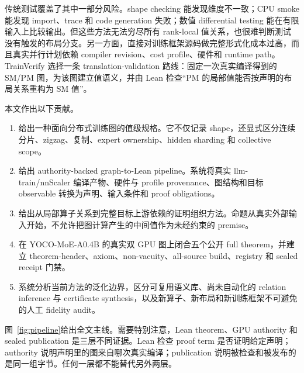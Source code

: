 \documentclass[10.5pt,a4paper]{ctexart}
\begin{document}
传统测试覆盖了其中一部分风险。shape checking 能发现维度不一致；CPU smoke 能发现 import、trace 和 code generation 失败；数值 differential testing 能在有限输入上比较输出。但这些方法无法穷尽所有 rank-local 值关系，也很难判断测试没有触发的布局分支。另一方面，直接对训练框架源码做完整形式化成本过高，而且真实并行计划依赖 compiler revision、cost profile、硬件和 runtime path。TrainVerify 选择一条 translation-validation 路线：固定一次真实编译得到的 SM/PM 图，为该图建立值语义，并由 Lean 检查“PM 的局部值能否按声明的布局关系重构为 SM 值”。

本文作出以下贡献。
\begin{enumerate}
  \item 给出一种面向分布式训练图的值级规格。它不仅记录 shape，还显式区分连续分片、zigzag、复制、expert ownership、hidden sharding 和 collective scope。
  \item 给出 authority-backed graph-to-Lean pipeline。系统将真实 llm-train/nnScaler 编译产物、硬件与 profile provenance、图结构和目标 observable 转换为声明、输入条件和 proof obligations。
  \item 给出从局部算子关系到完整目标上游依赖的证明组织方法。命题从真实外部输入开始，不允许把图计算产生的中间值作为未经约束的 premise。
  \item 在 YOCO-MoE-A0.4B 的真实双 GPU 图上闭合五个公开 full theorem，并建立 theorem-header、axiom、non-vacuity、all-source build、registry 和 sealed receipt 门禁。
  \item 系统分析当前方法的泛化边界，区分可复用语义库、尚未自动化的 relation inference 与 certificate synthesis，以及新算子、新布局和新训练框架不可避免的人工 fidelity audit。
\end{enumerate}

图~\ref{fig:pipeline}给出全文主线。需要特别注意，Lean theorem、GPU authority 和 sealed publication 是三层不同证据。Lean 检查 proof term 是否证明给定声明；authority 说明声明里的图来自哪次真实编译；publication 说明被检查和被发布的是同一组字节。任何一层都不能替代另外两层。
\end{document}
